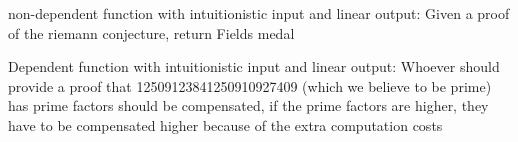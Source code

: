 non-dependent function with intuitionistic input and linear output:
Given a proof of the riemann conjecture, return Fields medal

Dependent function with intuitionistic input and linear output:
Whoever should provide a proof that 12509123841250910927409 (which we believe to be prime) has prime factors should be compensated, if the prime factors are higher, they have to be compensated higher because of the extra computation costs
